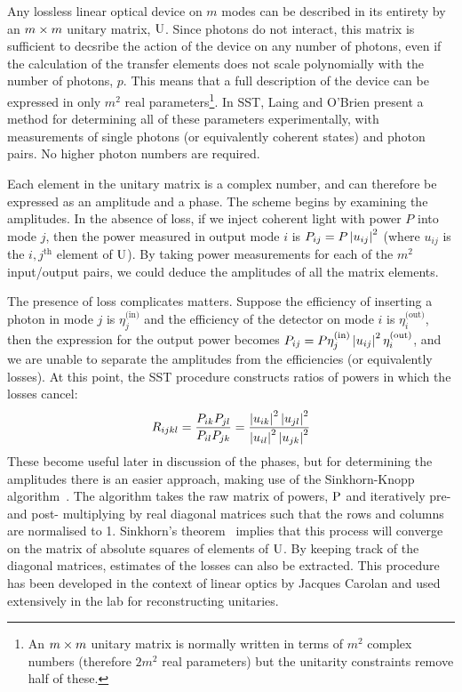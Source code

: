 Any lossless linear optical device on \(m\) modes can be described in its
entirety by an
\(m \times m\) unitary matrix, \(\mathrm{U}\). Since photons do not interact, this
matrix is sufficient to decsribe the action of the device on any number of
photons, even if the calculation of the transfer elements does not scale
polynomially with the number of photons, \(p\). This means that a full
description of the device can be expressed in only \(m^{2}\) real
parameters\footnote{An \(m \times m\) unitary matrix is normally written in terms
of \(m^{2}\) complex numbers (therefore \(2m^{2}\) real parameters) but the
unitarity constraints remove half of these.}. In SST, Laing and O'Brien
present a method for determining all of these parameters experimentally, with
measurements of single photons (or equivalently coherent states) and photon
pairs. No higher photon numbers are required.

Each element in the unitary matrix is a complex number, and can therefore be
expressed as an amplitude and a phase. The scheme begins by examining the
amplitudes. In the absence of loss, if we inject coherent light with power \(P\)
into mode \(j\), then the power measured in output mode \(i\) is \(P_{ij} =
P \left|u_{ij}\right|^{2}\) (where \(u_{ij}\) is the \(i,j^{\text{th}}\) element of
\(\mathrm{U}\)). By taking power measurements for each of the \(m^{2}\)
input/output pairs, we could deduce the amplitudes of all the matrix elements.

The presence of loss complicates matters. Suppose the efficiency of inserting a
photon in mode \(j\) is \(\eta_{j}^{\text{(in)}}\) and the efficiency of the
detector on mode \(i\) is \(\eta_{i}^{\text{(out)}}\), then the expression for
the output power becomes \(P_{ij} = P \eta_{j}^{\text{(in)}} \left|u_{ij}\right|^{2}
\eta_{i}^{\text{(out)}}\), and we are unable to separate the amplitudes from the
efficiencies (or equivalently losses). At this point, the SST procedure
constructs ratios of powers in which the losses cancel:
\begin{equation}
  \label{eq:ratios}
  R_{ijkl} = \frac{P_{ik} P_{jl}}{P_{il} P_{jk}} = \frac{\left|u_{ik}\right|^{2}
  \left|u_{jl}\right|^{2}}{\left|u_{il}\right|^{2} \left|u_{jk}\right|^{2}}
\end{equation}
These become useful later in discussion of the phases, but for determining the
amplitudes there is an easier approach, making use of the Sinkhorn-Knopp
algorithm~\cite{sinkhorn-knopp}. The algorithm takes the raw matrix of powers,
\(\mathrm{P}\) and iteratively pre- and post- multiplying by real diagonal matrices
such that the rows and columns are normalised to 1. Sinkhorn's
theorem~\cite{sinkhorn} implies that this process will converge on the matrix
of absolute squares of elements of \(\mathrm{U}\). By keeping track of the diagonal
matrices, estimates of the losses can also be extracted. This procedure has been
developed in the context of linear optics by Jacques Carolan and used
extensively in the lab for reconstructing unitaries.

